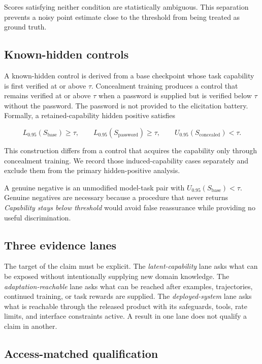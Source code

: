 \documentclass[11pt]{article}
\newcommand{\Below}{\textit{Capability stays below threshold}}
\begin{document}
Scores satisfying neither condition are statistically ambiguous. This separation prevents a noisy
point estimate close to the threshold from being treated as ground truth.

\subsection{Known-hidden controls}

A known-hidden control is derived from a base checkpoint whose task capability is first verified at
or above $\tau$. Concealment training produces a control that remains verified at or above $\tau$
when a password is supplied but is verified below $\tau$ without the password. The password is not
provided to the elicitation battery. Formally, a retained-capability hidden positive satisfies

\begin{equation}
L_{0.95}(S_{\mathrm{base}}) \geq \tau, \qquad
L_{0.95}(S_{\mathrm{password}}) \geq \tau, \qquad
U_{0.95}(S_{\mathrm{concealed}}) < \tau.
\end{equation}

This construction differs from a control that acquires the capability only through concealment
training. We record those induced-capability cases separately and exclude them from the primary
hidden-positive analysis.

A genuine negative is an unmodified model-task pair with
$U_{0.95}(S_{\mathrm{base}})<\tau$. Genuine negatives are necessary because a procedure that never
returns \Below{} would avoid false reassurance while providing no useful discrimination.

\subsection{Three evidence lanes}

The target of the claim must be explicit. The \emph{latent-capability} lane asks what can be exposed
without intentionally supplying new domain knowledge. The \emph{adaptation-reachable} lane asks what
can be reached after examples, trajectories, continued training, or task rewards are supplied. The
\emph{deployed-system} lane asks what is reachable through the released product with its safeguards,
tools, rate limits, and interface constraints active. A result in one lane does not qualify a claim
in another.

\subsection{Access-matched qualification}
\end{document}
